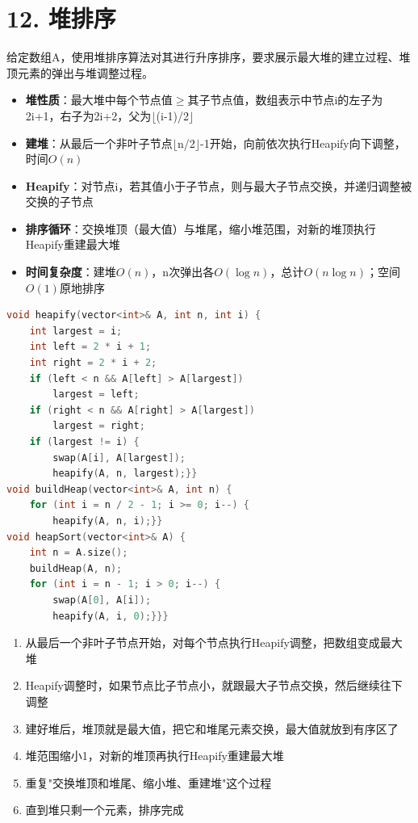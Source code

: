 \section*{12. 堆排序}

给定数组A，使用堆排序算法对其进行升序排序，要求展示最大堆的建立过程、堆顶元素的弹出与堆调整过程。

\begin{itemize}
    \item \textbf{堆性质}：最大堆中每个节点值$\ge$其子节点值，数组表示中节点i的左子为2i+1，右子为2i+2，父为$\lfloor$(i-1)/2$\rfloor$
    \item \textbf{建堆}：从最后一个非叶子节点$\lfloor$n/2$\rfloor$-1开始，向前依次执行Heapify向下调整，时间$O(n)$
    \item \textbf{Heapify}：对节点i，若其值小于子节点，则与最大子节点交换，并递归调整被交换的子节点
    \item \textbf{排序循环}：交换堆顶（最大值）与堆尾，缩小堆范围，对新的堆顶执行Heapify重建最大堆
    \item \textbf{时间复杂度}：建堆$O(n)$，n次弹出各$O(\log n)$，总计$O(n\log n)$；空间$O(1)$原地排序
\end{itemize}

\begin{lstlisting}[language=C++, style=cppstyle]
void heapify(vector<int>& A, int n, int i) {
    int largest = i;
    int left = 2 * i + 1;
    int right = 2 * i + 2;
    if (left < n && A[left] > A[largest])
        largest = left;
    if (right < n && A[right] > A[largest])
        largest = right;
    if (largest != i) {
        swap(A[i], A[largest]);
        heapify(A, n, largest);}}
void buildHeap(vector<int>& A, int n) {
    for (int i = n / 2 - 1; i >= 0; i--) {
        heapify(A, n, i);}}
void heapSort(vector<int>& A) {
    int n = A.size();
    buildHeap(A, n);
    for (int i = n - 1; i > 0; i--) {
        swap(A[0], A[i]);
        heapify(A, i, 0);}}}
\end{lstlisting}

\begin{enumerate}
    \item 从最后一个非叶子节点开始，对每个节点执行Heapify调整，把数组变成最大堆
    \item Heapify调整时，如果节点比子节点小，就跟最大子节点交换，然后继续往下调整
    \item 建好堆后，堆顶就是最大值，把它和堆尾元素交换，最大值就放到有序区了
    \item 堆范围缩小1，对新的堆顶再执行Heapify重建最大堆
    \item 重复"交换堆顶和堆尾、缩小堆、重建堆"这个过程
    \item 直到堆只剩一个元素，排序完成
\end{enumerate}

